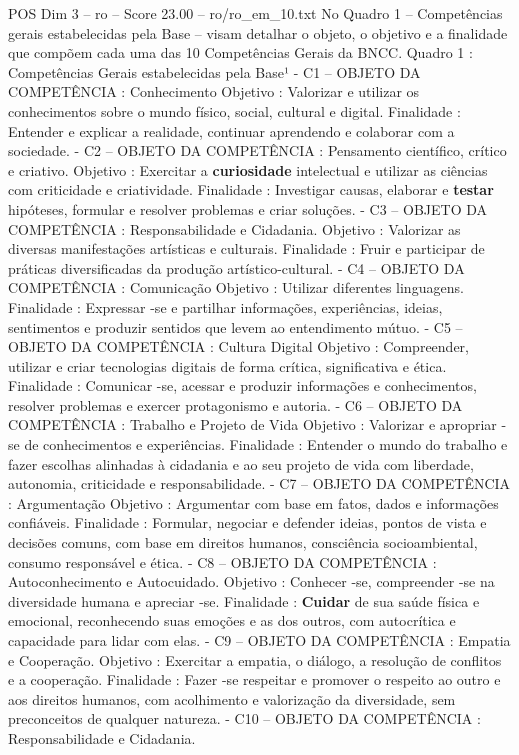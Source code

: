 \begin{textsample}{POS Dim 3 – ro – Score 23.00 – ro/ro\_em\_10.txt}
No Quadro 1 – Competências gerais estabelecidas pela Base – visam detalhar o objeto, o objetivo e a finalidade que compõem cada uma das 10 Competências Gerais da BNCC.
Quadro 1 : Competências Gerais estabelecidas pela Base¹ - C1 – OBJETO DA COMPETÊNCIA : Conhecimento Objetivo : Valorizar e utilizar os conhecimentos sobre o mundo físico, social, cultural e digital.
Finalidade : Entender e explicar a realidade, continuar aprendendo e colaborar com a sociedade. - C2 – OBJETO DA COMPETÊNCIA : Pensamento científico, crítico e criativo.
Objetivo : Exercitar a \textbf{curiosidade} intelectual e utilizar as ciências com criticidade e criatividade.
Finalidade : Investigar causas, elaborar e \textbf{testar} hipóteses, formular e resolver problemas e criar soluções. - C3 – OBJETO DA COMPETÊNCIA : Responsabilidade e Cidadania.
Objetivo : Valorizar as diversas manifestações artísticas e culturais.
Finalidade : Fruir e participar de práticas diversificadas da produção artístico-cultural. - C4 – OBJETO DA COMPETÊNCIA : Comunicação Objetivo : Utilizar diferentes linguagens.
Finalidade : Expressar -se e partilhar informações, experiências, ideias, sentimentos e produzir sentidos que levem ao entendimento mútuo. - C5 – OBJETO DA COMPETÊNCIA : Cultura Digital Objetivo : Compreender, utilizar e criar tecnologias digitais de forma crítica, significativa e ética.
Finalidade : Comunicar -se, acessar e produzir informações e conhecimentos, resolver problemas e exercer protagonismo e autoria. - C6 – OBJETO DA COMPETÊNCIA : Trabalho e Projeto de Vida Objetivo : Valorizar e apropriar -se de conhecimentos e experiências.
Finalidade : Entender o mundo do trabalho e fazer escolhas alinhadas à cidadania e ao seu projeto de vida com liberdade, autonomia, criticidade e responsabilidade. - C7 – OBJETO DA COMPETÊNCIA : Argumentação Objetivo : Argumentar com base em fatos, dados e informações confiáveis.
Finalidade : Formular, negociar e defender ideias, pontos de vista e decisões comuns, com base em direitos humanos, consciência socioambiental, consumo responsável e ética. - C8 – OBJETO DA COMPETÊNCIA : Autoconhecimento e Autocuidado.
Objetivo : Conhecer -se, compreender -se na diversidade humana e apreciar -se.
Finalidade : \textbf{Cuidar} de sua saúde física e emocional, reconhecendo suas emoções e as dos outros, com autocrítica e capacidade para lidar com elas. - C9 – OBJETO DA COMPETÊNCIA : Empatia e Cooperação.
Objetivo : Exercitar a empatia, o diálogo, a resolução de conflitos e a cooperação.
Finalidade : Fazer -se respeitar e promover o respeito ao outro e aos direitos humanos, com acolhimento e valorização da diversidade, sem preconceitos de qualquer natureza. - C10 – OBJETO DA COMPETÊNCIA : Responsabilidade e Cidadania.

\end{textsample}
